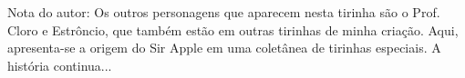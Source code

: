 \newpage
\thispagestyle{empty}

\vspace{-1cm} %
\noindent %
\begin{minipage}{7.7cm}%
\protect\vspace{16.5cm}%
  \large{{\clearsansbold Nota do autor:} \clearsansthin Os outros personagens que aparecem nesta tirinha são o Prof. Cloro e Estrôncio, que também estão em outras tirinhas de minha criação. Aqui, apresenta-se a origem do Sir Apple em uma coletânea de tirinhas especiais. A história continua...}
\end{minipage}
\hspace*{\fill} %
